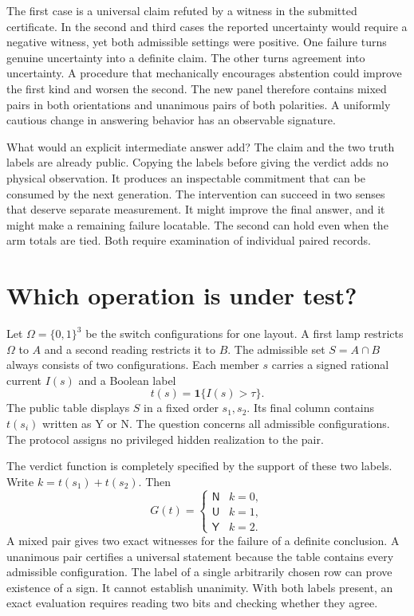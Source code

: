 \documentclass[12pt,letterpaper]{article}
\newcommand{\yes}{\mathsf Y}\newcommand{\no}{\mathsf N}\newcommand{\unk}{\mathsf U}
\begin{document}
The first case is a universal claim refuted by a witness in the submitted certificate. In the second and third cases the reported uncertainty would require a negative witness, yet both admissible settings were positive. One failure turns genuine uncertainty into a definite claim. The other turns agreement into uncertainty. A procedure that mechanically encourages abstention could improve the first kind and worsen the second. The new panel therefore contains mixed pairs in both orientations and unanimous pairs of both polarities. A uniformly cautious change in answering behavior has an observable signature.

What would an explicit intermediate answer add? The claim and the two truth labels are already public. Copying the labels before giving the verdict adds no physical observation. It produces an inspectable commitment that can be consumed by the next generation. The intervention can succeed in two senses that deserve separate measurement. It might improve the final answer, and it might make a remaining failure locatable. The second can hold even when the arm totals are tied. Both require examination of individual paired records.

\section{Which operation is under test?}
Let $\Omega=\{0,1\}^3$ be the switch configurations for one layout. A first lamp restricts $\Omega$ to $A$ and a second reading restricts it to $B$. The admissible set $S=A\cap B$ always consists of two configurations. Each member $s$ carries a signed rational current $I(s)$ and a Boolean label
\[
 t(s)=\mathbf{1}\{I(s)>\tau\}.
\]
The public table displays $S$ in a fixed order $s_1,s_2$. Its final column contains $t(s_i)$ written as Y or N. The question concerns all admissible configurations. The protocol assigns no privileged hidden realization to the pair.

The verdict function is completely specified by the support of these two labels. Write $k=t(s_1)+t(s_2)$. Then
\[
 G(t)=
 \begin{cases}\no & k=0,\\ \unk & k=1,\\ \yes & k=2.\end{cases}
\]
A mixed pair gives two exact witnesses for the failure of a definite conclusion. A unanimous pair certifies a universal statement because the table contains every admissible configuration. The label of a single arbitrarily chosen row can prove existence of a sign. It cannot establish unanimity. With both labels present, an exact evaluation requires reading two bits and checking whether they agree.
\end{document}
